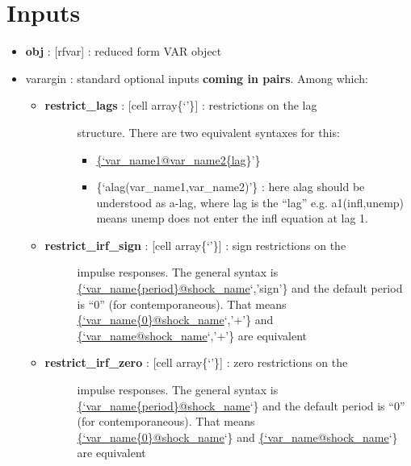\documentclass[letterpaper,10pt,english]{sphinxmanual}
\begin{document}
\section{Inputs}
\label{classes/models/@rfvar/rfvar:id140}\begin{itemize}
\item {} 
\textbf{obj} : {[}rfvar{]} : reduced form VAR object

\item {} 
varargin : standard optional inputs \textbf{coming in pairs}. Among which:
\begin{itemize}
\item {} \begin{description}
\item[{\textbf{restrict\_lags} : {[}cell array\textbar{}\{`'\}{]} : restrictions on the lag}] \leavevmode
structure. There are two equivalent syntaxes for this:
\begin{itemize}
\item {} 
\href{mailto:\{'var\_name1@var\_name2\{lag}{\{`var\_name1@var\_name2\{lag}\}'\}

\item {} 
\{`alag(var\_name1,var\_name2)'\} : here alag should be understood as
a-lag, where lag is the ``lag'' e.g. a1(infl,unemp) means unemp
does not enter the infl equation at lag 1.

\end{itemize}

\end{description}

\item {} \begin{description}
\item[{\textbf{restrict\_irf\_sign} : {[}cell array\textbar{}\{`'\}{]} : sign restrictions on the}] \leavevmode
impulse responses. The general syntax is
\href{mailto:\{'var\_name\{period\}@shock\_name}{\{`var\_name\{period\}@shock\_name}`,'sign'\} and the default period is
``0'' (for contemporaneous). That means
\href{mailto:\{'var\_name\{0\}@shock\_name}{\{`var\_name\{0\}@shock\_name}`,'+'\} and \href{mailto:\{'var\_name@shock\_name}{\{`var\_name@shock\_name}`,'+'\}
are equivalent

\end{description}

\item {} \begin{description}
\item[{\textbf{restrict\_irf\_zero} : {[}cell array\textbar{}\{`'\}{]} : zero restrictions on the}] \leavevmode
impulse responses. The general syntax is
\href{mailto:\{'var\_name\{period\}@shock\_name}{\{`var\_name\{period\}@shock\_name}`\} and the default period is
``0'' (for contemporaneous). That means
\href{mailto:\{'var\_name\{0\}@shock\_name}{\{`var\_name\{0\}@shock\_name}`\} and \href{mailto:\{'var\_name@shock\_name}{\{`var\_name@shock\_name}`\}
are equivalent


\end{description}
\end{itemize}
\end{itemize}
\end{document}
